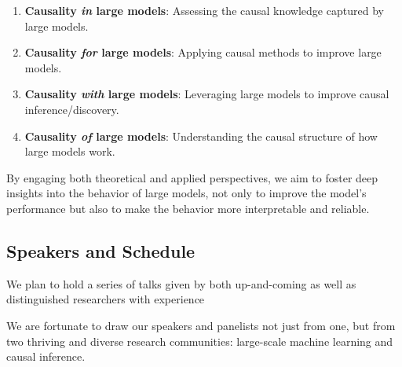 \documentclass{article}
\begin{document}
\begin{enumerate}
    \item \textbf{Causality \textit{in} large models}: Assessing the causal knowledge captured by large models. 
    \item \textbf{Causality \textit{for} large models}: Applying causal methods to improve large models.
    \item \textbf{Causality \textit{with} large models}: Leveraging large models to improve causal inference/discovery.
    \item \textbf{Causality \textit{of} large models}: Understanding the causal structure of how large models work.

\end{enumerate}

By engaging both theoretical and applied perspectives, we aim to foster deep insights into the behavior of large models, not only to improve the model's performance but also to make the behavior more interpretable and reliable.



\subsection{Speakers and Schedule}


We plan to hold a series of talks given by both up-and-coming as well as distinguished researchers with experience

We are fortunate to draw our speakers and panelists not just from one, but from two thriving and diverse research communities: large-scale machine learning and causal inference.
\end{document}
